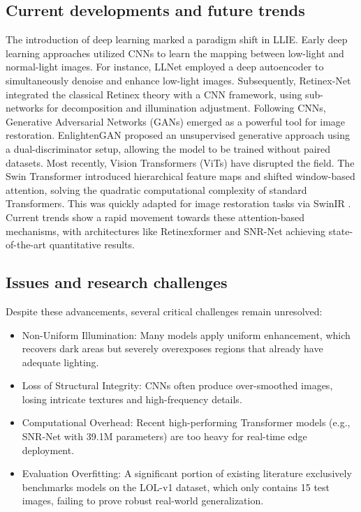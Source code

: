 \documentclass[12pt, a4paper]{report}
\begin{document}
\subsection{Current developments and future trends}
The introduction of deep learning marked a paradigm shift in LLIE. Early deep learning approaches utilized CNNs to learn the mapping between low-light and normal-light images. For instance, LLNet \cite{lore2017llnet} employed a deep autoencoder to simultaneously denoise and enhance low-light images. Subsequently, Retinex-Net integrated the classical Retinex theory with a CNN framework, using sub-networks for decomposition and illumination adjustment. Following CNNs, Generative Adversarial Networks (GANs) emerged as a powerful tool for image restoration. EnlightenGAN \cite{jiang2021enlightengan} proposed an unsupervised generative approach using a dual-discriminator setup, allowing the model to be trained without paired datasets. Most recently, Vision Transformers (ViTs) have disrupted the field. The Swin Transformer \cite{liu2021swin} introduced hierarchical feature maps and shifted window-based attention, solving the quadratic computational complexity of standard Transformers. This was quickly adapted for image restoration tasks via SwinIR \cite{liang2021swinir}. Current trends show a rapid movement towards these attention-based mechanisms, with architectures like Retinexformer \cite{cai2023retinexformer} and SNR-Net \cite{xu2022snrnet} achieving state-of-the-art quantitative results.

\subsection{Issues and research challenges}
Despite these advancements, several critical challenges remain unresolved:
\begin{itemize}
    \item Non-Uniform Illumination: Many models apply uniform enhancement, which recovers dark areas but severely overexposes regions that already have adequate lighting.
    \item Loss of Structural Integrity: CNNs often produce over-smoothed images, losing intricate textures and high-frequency details.
    \item Computational Overhead: Recent high-performing Transformer models (e.g., SNR-Net with 39.1M parameters) are too heavy for real-time edge deployment.
    \item Evaluation Overfitting: A significant portion of existing literature exclusively benchmarks models on the LOL-v1 dataset, which only contains 15 test images, failing to prove robust real-world generalization.
\end{itemize}
\end{document}
